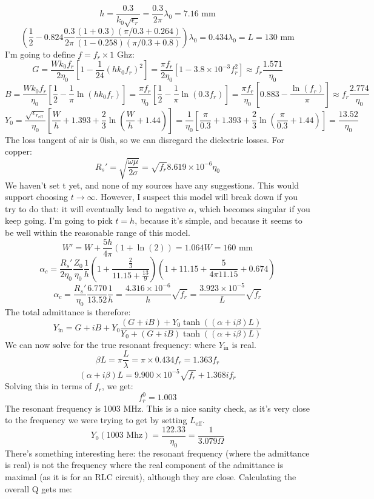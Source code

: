 \documentclass[final]{article}
\begin{document}
\[h=\frac{0.3}{k_0 \sqrt{\epsilon_r}}=\frac{0.3}{2\pi} \lambda_0=7.16 \text{ mm}\]
\[\left(\frac{1}{2}-0.824 \frac{0.3}{2\pi} \frac{(1+0.3)(\pi/0.3+0.264)}{(1-0.258)(\pi/0.3+0.8)}\right)\lambda_0=0.434\lambda_0=L=130 \text{ mm}\]
I'm going to define \(f=f_r \times 1\text{ Ghz}\):
\[G=\frac{Wk_0 f_r}{2\eta_0} \left[1-\frac{1}{24}\left(hk_0 f_r\right)^2\right]=\frac{\pi f_r}{2\eta_0} \left[1-3.8\times 10^{-3}f_r^2\right]
\approx f_r \frac{1.571}{\eta_0}\]
\[B=\frac{Wk_0 f_r}{\eta_0} \left[\frac{1}{2}-\frac{1}{\pi} \ln\left(hk_0 f_r\right)\right]=
\frac{\pi f_r}{\eta_0} \left[\frac{1}{2}-\frac{1}{\pi} \ln\left(0.3 f_r\right)\right]=
\frac{\pi f_r}{\eta_0} \left[0.883-\frac{\ln(f_r)}{\pi} \right]\approx f_r\frac{2.774}{\eta_0}\]
\[Y_0=\frac{\sqrt{\epsilon_{r_{\text{eff}}}}}{\eta_0}\left[\frac{W}{h}+1.393+\frac{2}{3}\ln\left(\frac{W}{h}+1.44\right)\right]=
\frac{1}{\eta_0}\left[\frac{\pi}{0.3}+1.393+\frac{2}{3}\ln\left(\frac{\pi}{0.3}+1.44\right)\right]=\frac{13.52}{\eta_0}\]
The loss tangent of air is 0ish, so we can disregard the dielectric losses.
For copper:
\[R_s'=\sqrt{\frac{\omega \mu}{2\sigma}}=\sqrt{f_r} 8.619\times 10^{-6} \eta_0\]
We haven't set t yet, and none of my sources have any suggestions.
This would support choosing \(t\rightarrow \infty\). However, I suspect this model will break down if you try to do that: it will eventually lead to negative \(\alpha\), which becomes singular if you keep going. I'm going to pick \(t=h\), because it's simple, and because it seems to be well within the reasonable range of this model.
\[W'=W+\frac{5h}{4\pi}\left(1+\ln\left(2\right)\right)=1.064 W=160 \text{ mm}\]
\[\alpha_c=\frac{R_s'}{2\eta_0} \frac{Z_0}{\eta_0} \frac{1}{h}\left(1+\frac{\frac{2}{3}}{11.15+\frac{13}{9}}\right)
\left(1+11.15+\frac{5}{4\pi 11.15}+0.674\right)\]
\[\alpha_c=\frac{R_s'}{\eta_0} \frac{6.770}{13.52} \frac{1}{h}=\frac{4.316\times 10^{-6}}{h}\sqrt{f_r}=\frac{3.923\times 10^{-5}}{L}\sqrt{f_r}\]
The total admittance is therefore:
\[Y_{\text{in}}=G+iB+Y_0 \frac{(G+iB)+Y_0\tanh((\alpha+i\beta) L)}{Y_0+(G+iB)\tanh((\alpha+i\beta) L)}\]
We can now solve for the true resonant frequency: where \(Y_{\text{in}}\) is real.
\[\beta L=\pi \frac{L}{\lambda}=\pi\times0.434 f_r=1.363 f_r\]
\[(\alpha+i\beta) L=9.900\times 10^{-5}\sqrt{f_r}+1.368 i f_r\]
Solving this in terms of \(f_r\), we get:
\[f_r^0=1.003\]
The resonant frequency is 1003 MHz. This is a nice sanity check, as it's very close to the frequency we were trying to get by setting \(L_\text{eff}\).
\[Y_0(1003\text{ Mhz})=\frac{122.33}{\eta_0}=\frac{1}{3.079 \Omega}\]
There's something interesting here: the resonant frequency (where the admittance is real) is not the frequency where the real component of the admittance is maximal (as it is for an RLC circuit), although they are close. Calculating the overall Q gets me:
\end{document}

